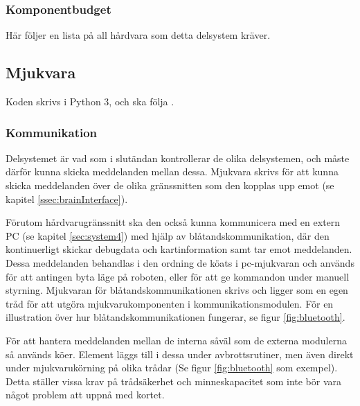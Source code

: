 \documentclass[a4paper,11pt]{article}
\begin{document}
\subsubsection{Komponentbudget}
Här följer en lista på all hårdvara som detta delsystem kräver.

\begin{HardwareList}
\end{HardwareList}

\subsection{Mjukvara}
Koden skrivs i Python 3, och ska följa \cite{pep8}.

\subsubsection{Kommunikation}
Delsystemet är vad som i slutändan kontrollerar de olika delsystemen, och måste därför kunna skicka meddelanden mellan dessa. Mjukvara skrivs för att kunna skicka meddelanden över de olika gränssnitten som den kopplas upp emot (se kapitel \ref{ssec:brainInterface}).

Förutom hårdvarugränssnitt ska den också kunna kommunicera med en extern PC (se kapitel \ref{sec:system4}) med hjälp av blåtandskommunikation, där den kontinuerligt skickar debugdata och kartinformation samt tar emot meddelanden. Dessa meddelanden behandlas i den ordning de köats i pc-mjukvaran och används för att antingen byta läge på roboten, eller för att ge kommandon under manuell styrning. Mjukvaran för blåtandskommunikationen skrivs och ligger som en egen tråd för att utgöra mjukvarukomponenten i kommunikationsmodulen. För en illustration över hur blåtandskommunikationen fungerar, se figur \ref{fig:bluetooth}.

För att hantera meddelanden mellan de interna såväl som de externa modulerna så används köer. Element läggs till i dessa under avbrottsrutiner, men även direkt under mjukvarukörning på olika trådar (Se figur \ref{fig:bluetooth} som exempel). Detta ställer vissa krav på trådsäkerhet och minneskapacitet som inte bör vara något problem att uppnå med kortet.
\end{document}
